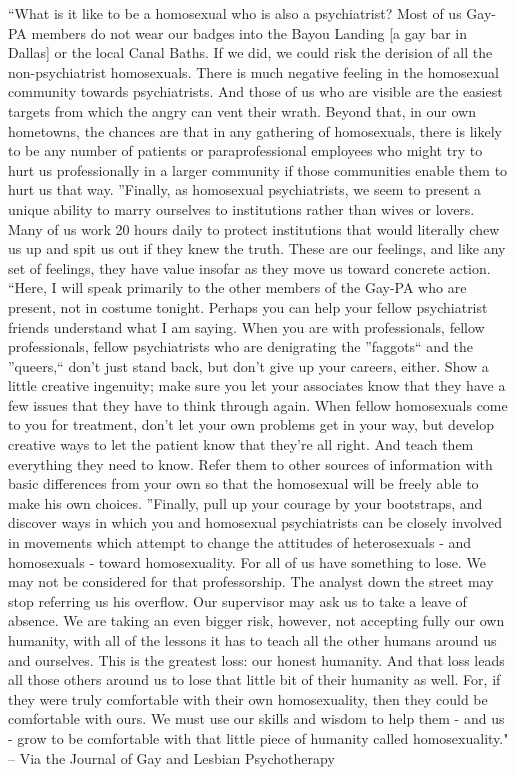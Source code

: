 ``What is it like to be a homosexual who is also a psychiatrist? Most of us Gay-PA members do not wear our badges into the Bayou Landing [a gay bar in Dallas] or the local Canal Baths. If we did, we could risk the derision of all the non-psychiatrist homosexuals. There is much negative feeling in the homosexual community towards psychiatrists. And those of us who are visible are the easiest targets from which the angry can vent their wrath. Beyond that, in our own hometowns, the chances are that in any gathering of homosexuals, there is likely to be any number of patients or paraprofessional employees who might try to hurt us professionally in a larger community if those communities enable them to hurt us that way.
''Finally, as homosexual psychiatrists, we seem to present a unique ability to marry ourselves to institutions rather than wives or lovers. Many of us work 20 hours daily to protect institutions that would literally chew us up and spit us out if they knew the truth. These are our feelings, and like any set of feelings, they have value insofar as they move us toward concrete action.
``Here, I will speak primarily to the other members of the Gay-PA who are present, not in costume tonight. Perhaps you can help your fellow psychiatrist friends understand what I am saying. When you are with professionals, fellow professionals, fellow psychiatrists who are denigrating the ''faggots`` and the ''queers,`` don’t just stand back, but don’t give up your careers, either. Show a little creative ingenuity; make sure you let your associates know that they have a few issues that they have to think through again. When fellow homosexuals come to you for treatment, don’t let your own problems get in your way, but develop creative ways to let the patient know that they’re all right. And teach them everything they need to know. Refer them to other sources of information with basic differences from your own so that the homosexual will be freely able to make his own choices.
''Finally, pull up your courage by your bootstraps, and discover ways in which you and homosexual psychiatrists can be closely involved in movements which attempt to change the attitudes of heterosexuals - and homosexuals - toward homosexuality. For all of us have something to lose. We may not be considered for that professorship. The analyst down the street may stop referring us his overflow. Our supervisor may ask us to take a leave of absence. We are taking an even bigger risk, however, not accepting fully our own humanity, with all of the lessons it has to teach all the other humans around us and ourselves. This is the greatest loss: our honest humanity. And that loss leads all those others around us to lose that little bit of their humanity as well. For, if they were truly comfortable with their own homosexuality, then they could be comfortable with ours. We must use our skills and wisdom to help them - and us - grow to be comfortable with that little piece of humanity called homosexuality."
– Via the Journal of Gay and Lesbian Psychotherapy

